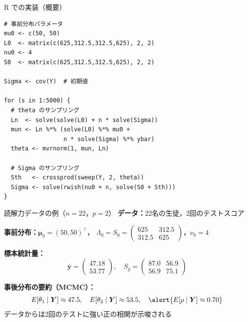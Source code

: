 \documentclass[lualatex,aspectratio=169,12pt]{beamer}
\begin{document}
\begin{frame}[fragile]{R での実装（概要）}
\begin{lstlisting}
# 事前分布パラメータ
mu0 <- c(50, 50)
L0  <- matrix(c(625,312.5,312.5,625), 2, 2)
nu0 <- 4
S0  <- matrix(c(625,312.5,312.5,625), 2, 2)

Sigma <- cov(Y)  # 初期値

for (s in 1:5000) {
  # theta のサンプリング
  Ln  <- solve(solve(L0) + n * solve(Sigma))
  mun <- Ln %*% (solve(L0) %*% mu0 +
                 n * solve(Sigma) %*% ybar)
  theta <- mvrnorm(1, mun, Ln)

  # Sigma のサンプリング
  Sth   <- crossprod(sweep(Y, 2, theta))
  Sigma <- solve(rwish(nu0 + n, solve(S0 + Sth)))
}
\end{lstlisting}
\end{frame}

\begin{frame}{読解力データの例（$n=22$，$p=2$）}
  \textbf{データ：}22名の生徒，2回のテストスコア

  \medskip
  \textbf{事前分布：}$\bm{\mu}_0 = (50, 50)^\top$，
  $\Lambda_0 = S_0 = \begin{pmatrix}625 & 312.5 \\ 312.5 & 625\end{pmatrix}$，$\nu_0 = 4$

  \bigskip
  \textbf{標本統計量：}
  \[
    \bar{\bm{y}} = \begin{pmatrix}47.18 \\ 53.77\end{pmatrix}, \quad
    S_{\bar{y}} = \begin{pmatrix}87.0 & 56.9 \\ 56.9 & 75.1\end{pmatrix}
  \]

  \bigskip
  \textbf{事後分布の要約（MCMC）：}
  \[
    E[\theta_1\mid\bm{Y}] \approx 47.5, \quad
    E[\theta_2\mid\bm{Y}] \approx 53.5, \quad
    \alert{E[\rho\mid\bm{Y}] \approx 0.70}
  \]
  データからは2回のテストに\alert{強い正の相関}が示唆される
\end{frame}
\end{document}
